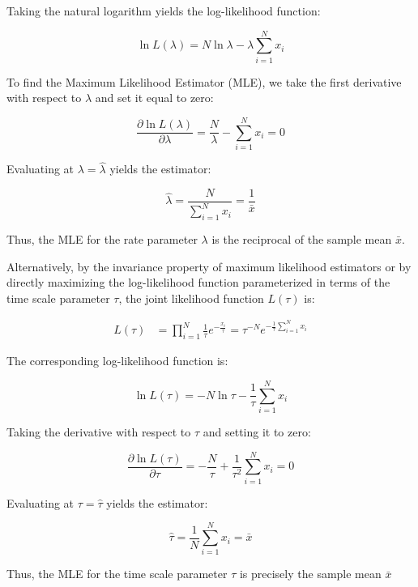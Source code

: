 Taking the natural logarithm yields the log-likelihood function:

	\[
	\ln L(\lambda) = N \ln \lambda - \lambda \sum_{i=1}^N x_i
	\]

To find the Maximum Likelihood Estimator (MLE), we take the first derivative with respect to $\lambda$ and set it equal to zero:

	\[
	\frac{\partial \ln L(\lambda)}{\partial \lambda} = \frac{N}{\lambda} - \sum_{i=1}^N x_i = 0
	\]

Evaluating at $\lambda = \hat{\lambda}$ yields the estimator:

\begin{equation}
	\hat{\lambda} = \frac{N}{\sum_{i=1}^N x_i} = \frac{1}{\bar{x}}
\end{equation}

Thus, the MLE for the rate parameter $\lambda$ is the reciprocal of the sample mean $\bar{x}$.

Alternatively, by the invariance property of maximum likelihood estimators or by directly maximizing the log-likelihood function parameterized in terms of the time scale parameter $\tau$, the joint likelihood function $L(\tau)$ is:

\begin{align*}
	L(\tau) &= \prod_{i=1}^N \frac{1}{\tau} e^{-\frac{x_i}{\tau}} = \tau^{-N} e^{-\frac{1}{\tau} \sum_{i=1}^N x_i}
\end{align*}

The corresponding log-likelihood function is:

	\[
	\ln L(\tau) = -N \ln \tau - \frac{1}{\tau} \sum_{i=1}^N x_i
	\]

Taking the derivative with respect to $\tau$ and setting it to zero:

	\[
	\frac{\partial \ln L(\tau)}{\partial \tau} = -\frac{N}{\tau} + \frac{1}{\tau^2} \sum_{i=1}^N x_i = 0
	\]
	
Evaluating at $\tau = \hat{\tau}$ yields the estimator:

\begin{equation}
	\hat{\tau} = \frac{1}{N} \sum_{i=1}^N x_i = \bar{x}
\end{equation}

Thus, the MLE for the time scale parameter $\tau$ is precisely the sample mean $\bar{x}$






